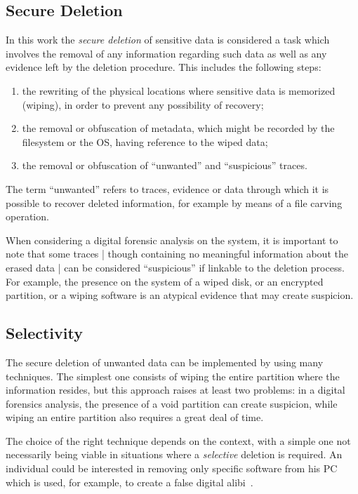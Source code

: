 \documentclass[conference]{IEEEtran}
\begin{document}
\subsection{Secure Deletion}
\label{secdel}
In this work the \textit{secure deletion} of sensitive data is considered a task which involves the removal of any information regarding such data as well as any evidence left by the deletion procedure. This includes the following steps:
\begin{enumerate}
 \item the rewriting of the physical locations where sensitive data is memorized (wiping), in order to prevent any possibility of recovery;
 \item the removal or obfuscation of metadata, which might be recorded by the filesystem or the OS, having reference to the wiped data;
 \item the removal or obfuscation of ``unwanted'' and ``suspicious'' traces.
\end{enumerate}

The term ``unwanted'' refers to traces, evidence or data through which it is possible to recover deleted information, for example by means of a file carving operation. %

When considering a digital forensic analysis on the system, it is important to note that some traces | though containing no meaningful information about the erased data | can be considered ``suspicious'' if linkable to the deletion process. %
For example, the presence on the system of a wiped disk, or an encrypted partition, or a wiping software is an atypical evidence that may create suspicion.

\subsection{Selectivity}
The secure deletion of unwanted data can be implemented by using many techniques. The simplest one consists of wiping the entire partition where the information resides, but this approach raises at least two problems: in a digital forensics analysis, the presence of a void partition can create suspicion, while wiping an entire partition also requires a great deal of time.

The choice of the right technique depends on the context, with a simple one not necessarily being viable in situations where a \textit{selective} deletion is required. An individual could be interested in removing only specific software from his PC which is used, for example, to create a false digital alibi~\cite{autoalibi}.
\end{document}

